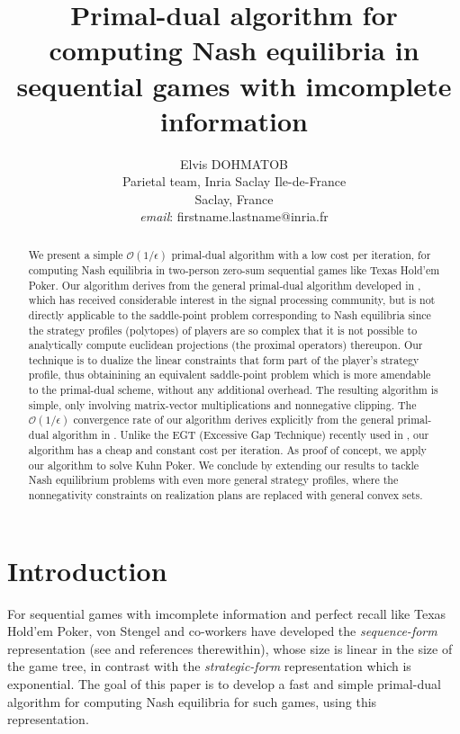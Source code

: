 \documentclass{article} %
\author{
Elvis DOHMATOB
\\
Parietal team, Inria Saclay Ile-de-France\\
Saclay, France\\
\textit{email}: firstname.lastname@inria.fr}
\title{Primal-dual algorithm for computing Nash equilibria in
sequential games with imcomplete information
}
\begin{document}
\maketitle

\begin{abstract}
We present a simple $\mathcal{O}(1/\epsilon)$ primal-dual algorithm with a low cost per iteration, for computing Nash equilibria in two-person zero-sum sequential games like Texas Hold'em Poker. %
Our algorithm derives from the general primal-dual algorithm developed
in \cite{chambolle2010}, which has received considerable interest in the signal processing community, but is not directly applicable to the saddle-point problem corresponding to Nash equilibria since the strategy profiles (polytopes) of players are so complex that it is not possible
 to analytically compute
euclidean
 projections (the proximal operators) thereupon.
Our technique is to dualize the linear constraints that form part of the player's strategy profile, thus obtainining an equivalent saddle-point problem which is more amendable to the primal-dual scheme, without any additional overhead. The resulting algorithm is simple, only involving matrix-vector multiplications
and nonnegative clipping.
The $\mathcal{O}(1/\epsilon)$ convergence rate of our algorithm derives explicitly from the general primal-dual algorithm in \cite{chambolle2010}. Unlike the EGT (Excessive Gap Technique) recently used in \cite{hoda2010smoothing}, our algorithm has a cheap and constant cost per iteration. As proof of concept, we apply our algorithm to solve Kuhn Poker.
We conclude by extending our results to tackle Nash equilibrium problems with even more general strategy profiles, where the nonnegativity constraints on realization plans are replaced with general convex sets.
\end{abstract}

\section{Introduction}
\label{sec:intro}
For sequential games with imcomplete information and perfect recall like Texas Hold'em Poker, von Stengel and co-workers have developed the \textit{sequence-form} representation (see \cite{von1996efficient} and references therewithin), whose size is linear in the size of the game tree, in contrast with the \textit{strategic-form} representation which is exponential. The goal of this paper is to develop a fast and simple primal-dual algorithm for computing Nash equilibria for such games, using this representation.
\end{document}
